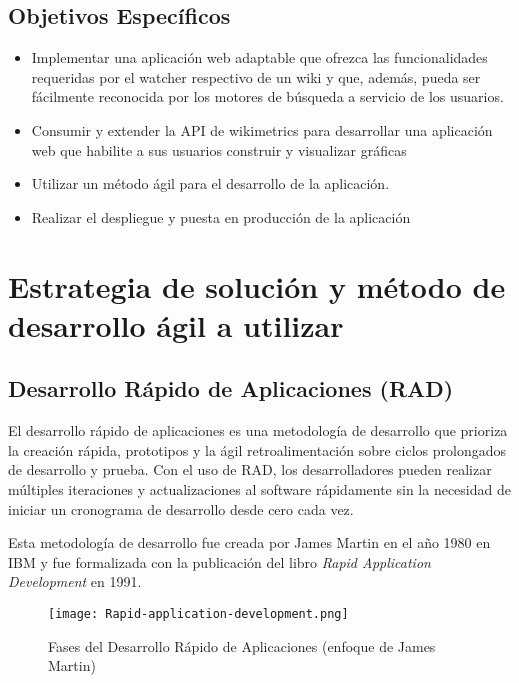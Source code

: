\subsection{Objetivos Específicos}

\begin{itemize}
    \item Implementar una aplicación web adaptable que ofrezca las funcionalidades requeridas por el watcher respectivo de un wiki y que, además, pueda ser fácilmente reconocida por los motores de búsqueda a servicio de los usuarios.
    \item Consumir y extender la API de wikimetrics para desarrollar una aplicación web que habilite a sus usuarios construir y visualizar gráficas
    \item Utilizar un método ágil para el desarrollo de la aplicación.
    \item Realizar el despliegue y puesta en producción de la aplicación
\end{itemize}

\section{Estrategia de solución y método de desarrollo ágil a utilizar}

\subsection{Desarrollo Rápido de Aplicaciones (RAD)}


El desarrollo rápido de aplicaciones es una metodología de desarrollo que prioriza la creación rápida, prototipos y la ágil retroalimentación sobre ciclos prolongados de desarrollo y prueba. Con el uso de RAD, los desarrolladores pueden realizar múltiples iteraciones y actualizaciones al software rápidamente sin la necesidad de iniciar un cronograma de desarrollo desde cero cada vez.

Esta metodología de desarrollo fue creada por James Martin en el año 1980 en IBM y fue formalizada con la publicación del libro \emph{Rapid Application Development} en 1991.

\begin{figure}[H]
    \centering
    \texttt{[image: Rapid-application-development.png]}
    \caption{Fases del Desarrollo Rápido de Aplicaciones (enfoque de James Martin)}
    \label{fig:Rapid-application-development}
\end{figure}

